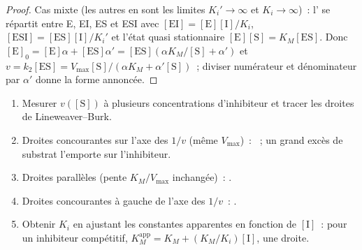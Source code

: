 \begin{proof}
Cas mixte (les autres en sont les limites $K_i' \to \infty$ et
$K_i \to \infty$)~: l' se répartit entre E, EI, ES et ESI avec
$[\mathrm{EI}] = [\mathrm E][\mathrm I]/K_i$, $[\mathrm{ESI}] = [\mathrm{ES}][\mathrm I]/K_i'$
et l'état quasi stationnaire $[\mathrm E][\mathrm S] = K_M[\mathrm{ES}]$. Donc $[\mathrm E]_0 = [\mathrm E]\alpha + [\mathrm{ES}]\alpha' =
[\mathrm{ES}](\alpha K_M/[\mathrm S] + \alpha')$ et $v = k_2[\mathrm{ES}] = V_{\max}[\mathrm S]/(\alpha K_M + \alpha'[\mathrm S])$~;
diviser numérateur et dénominateur par $\alpha'$ donne la forme
annoncée.
\end{proof}

\begin{method}\label{met:b3:complex-kinetics:inhibition-type}
\begin{enumerate}
  \item Mesurer $v([\mathrm S])$ à plusieurs concentrations d'inhibiteur
        et tracer les droites de Lineweaver--Burk.
  \item Droites concourantes sur l'axe des $1/v$ (même $V_{\max}$)~:
        ~; un grand excès de substrat l'emporte sur
        l'inhibiteur.
  \item Droites parallèles (pente $K_M/V_{\max}$ inchangée)~: .
  \item Droites concourantes à gauche de l'axe des $1/v$~: .
  \item Obtenir $K_i$ en ajustant les constantes apparentes en fonction
        de $[\mathrm I]$~: pour un inhibiteur compétitif,
        $K_M^{\mathrm{app}} = K_M + (K_M/K_i)[\mathrm I]$, une droite.
\end{enumerate}
\end{method}

